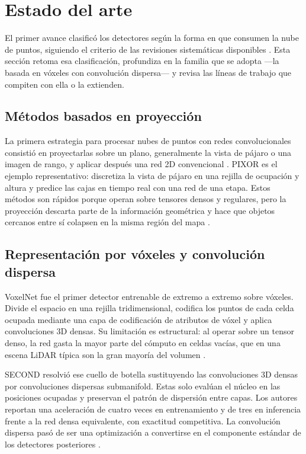 \documentclass[11pt,letterpaper]{article}
\begin{document}
\section{Estado del arte}

El primer avance clasificó los detectores según la forma en que consumen la nube de puntos, siguiendo el criterio de las revisiones sistemáticas disponibles \cite{qian2022, zamanakos2021, cai2025}. Esta sección retoma esa clasificación, profundiza en la familia que se adopta ---la basada en vóxeles con convolución dispersa--- y revisa las líneas de trabajo que compiten con ella o la extienden.

\subsection{Métodos basados en proyección}
\label{sec:proyeccion}

La primera estrategia para procesar nubes de puntos con redes convolucionales consistió en proyectarlas sobre un plano, generalmente la vista de pájaro o una imagen de rango, y aplicar después una red 2D convencional \cite{qian2022, zamanakos2021}. PIXOR \cite{yang2018} es el ejemplo representativo: discretiza la vista de pájaro en una rejilla de ocupación y altura y predice las cajas en tiempo real con una red de una etapa. Estos métodos son rápidos porque operan sobre tensores densos y regulares, pero la proyección descarta parte de la información geométrica y hace que objetos cercanos entre sí colapsen en la misma región del mapa \cite{cai2025}.

\subsection{Representación por vóxeles y convolución dispersa}
\label{sec:voxeles}

VoxelNet \cite{zhou2018} fue el primer detector entrenable de extremo a extremo sobre vóxeles. Divide el espacio en una rejilla tridimensional, codifica los puntos de cada celda ocupada mediante una capa de codificación de atributos de vóxel y aplica convoluciones 3D densas. Su limitación es estructural: al operar sobre un tensor denso, la red gasta la mayor parte del cómputo en celdas vacías, que en una escena LiDAR típica son la gran mayoría del volumen \cite{zamanakos2021}.

SECOND \cite{yan2018} resolvió ese cuello de botella sustituyendo las convoluciones 3D densas por convoluciones dispersas submanifold. Estas solo evalúan el núcleo en las posiciones ocupadas y preservan el patrón de dispersión entre capas. Los autores reportan una aceleración de cuatro veces en entrenamiento y de tres en inferencia frente a la red densa equivalente, con exactitud competitiva. La convolución dispersa pasó de ser una optimización a convertirse en el componente estándar de los detectores posteriores \cite{ke2025, ao2026}.
\end{document}
